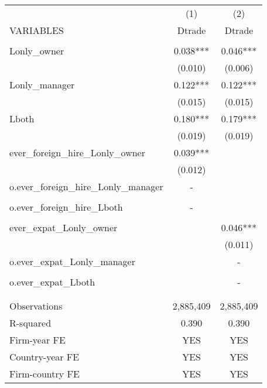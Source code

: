 \begin{tabular}{lcc} \hline
 & (1) & (2) \\
VARIABLES & Dtrade & Dtrade \\ \hline
 &  &  \\
Lonly\_owner & 0.038*** & 0.046*** \\
 & (0.010) & (0.006) \\
Lonly\_manager & 0.122*** & 0.122*** \\
 & (0.015) & (0.015) \\
Lboth & 0.180*** & 0.179*** \\
 & (0.019) & (0.019) \\
ever\_foreign\_hire\_Lonly\_owner & 0.039*** &  \\
 & (0.012) &  \\
o.ever\_foreign\_hire\_Lonly\_manager & - &  \\
 &  &  \\
o.ever\_foreign\_hire\_Lboth & - &  \\
 &  &  \\
ever\_expat\_Lonly\_owner &  & 0.046*** \\
 &  & (0.011) \\
o.ever\_expat\_Lonly\_manager &  & - \\
 &  &  \\
o.ever\_expat\_Lboth &  & - \\
 &  &  \\
 &  &  \\
Observations & 2,885,409 & 2,885,409 \\
R-squared & 0.390 & 0.390 \\
Firm-year FE & YES & YES \\
Country-year FE & YES & YES \\
 Firm-country FE & YES & YES \\ \hline
\end{tabular}
